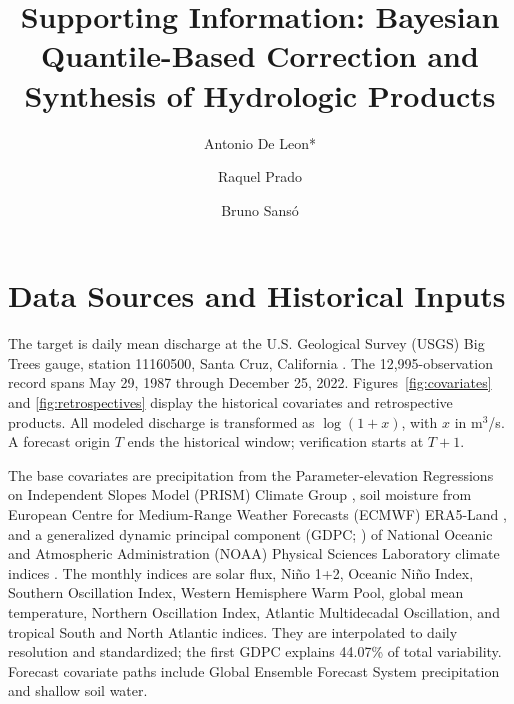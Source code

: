 \documentclass[APA,STIX1COL]{WileyNJD-v2}
\renewcommand{\thefigure}{\arabic{figure}}
\renewcommand{\thetable}{\arabic{table}}
\begin{document}
\title{Supporting Information: Bayesian Quantile-Based Correction and Synthesis of Hydrologic Products}

\author[1]{Antonio De Leon*}
\author[1]{Raquel Prado}
\author[1]{Bruno Sans\'o}


\address[1]{, , }




\maketitle


\renewcommand{\thesection}{S\arabic{section}}
\renewcommand{\thefigure}{S\arabic{figure}}
\renewcommand{\thetable}{S\arabic{table}}
\renewcommand{\theequation}{S\arabic{equation}}
\renewcommand{\thealgorithm}{S\arabic{algorithm}}

\section{Data Sources and Historical Inputs}
\label{sec:data}
\label{app:datahistories}

The target is daily mean discharge at the U.S. Geological Survey (USGS) Big Trees gauge, station 11160500, Santa Cruz, California \citep{usgs_daily_11160500}. The 12,995-observation record spans May 29, 1987 through December 25, 2022. Figures~\ref{fig:covariates} and \ref{fig:retrospectives} display the historical covariates and retrospective products. All modeled discharge is transformed as $\log(1+x)$, with $x$ in m$^3$/s. A forecast origin $T$ ends the historical window; verification starts at $T+1$.

The base covariates are precipitation from the Parameter-elevation Regressions on Independent Slopes Model (PRISM) Climate Group \citep{prism}, soil moisture from European Centre for Medium-Range Weather Forecasts (ECMWF) ERA5-Land \citep{ecmwf,munozsabater2021era5land}, and a generalized dynamic principal component (GDPC; \citealp{JSSv092c02}) of National Oceanic and Atmospheric Administration (NOAA) Physical Sciences Laboratory climate indices \citep{noaa_climate_indices}. The monthly indices are solar flux, Ni\~no 1+2, Oceanic Ni\~no Index, Southern Oscillation Index, Western Hemisphere Warm Pool, global mean temperature, Northern Oscillation Index, Atlantic Multidecadal Oscillation, and tropical South and North Atlantic indices. They are interpolated to daily resolution and standardized; the first GDPC explains 44.07\% of total variability. Forecast covariate paths include Global Ensemble Forecast System precipitation and shallow soil water.
\end{document}
